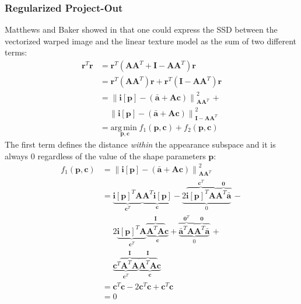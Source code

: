 \subsubsection{Regularized Project-Out}
\label{sec:rpo}

Matthews and Baker showed in \cite{Matthews2004} that one could express the SSD between the vectorized warped image and the linear texture model as the sum of two different terms:
\begin{equation}
    \begin{aligned}
        \mathbf{r}^T \mathbf{r} & = \mathbf{r}^T (\mathbf{A}\mathbf{A}^T + \mathbf{I} - \mathbf{A}\mathbf{A}^T) \mathbf{r}
        \\
        & = \mathbf{r}^T (\mathbf{A}\mathbf{A}^T) \mathbf{r} + \mathbf{r}^T (\mathbf{I} - \mathbf{A}\mathbf{A}^T) \mathbf{r}
        \\
        & = \left\| \mathbf{i}[\mathbf{p}] - \left( \bar{\mathbf{a}} + \mathbf{A} \mathbf{c} \right) \right\|_{\mathbf{A}\mathbf{A}^T}^2 \, + 
        \\
        & \quad \, \left\| \mathbf{i}[\mathbf{p}] - \left( \bar{\mathbf{a}} + \mathbf{A} \mathbf{c} \right) \right\|_{\mathbf{I} - \mathbf{A}\mathbf{A}^T}^2 
        \\
        & = \underset{\mathbf{p}, \mathbf{c}}{\mathrm{arg\,min\;}} f_1(\mathbf{p}, \mathbf{c}) + f_2(\mathbf{p}, \mathbf{c})
    \label{eq:ssd_terms}
    \end{aligned}
\end{equation}
The first term defines the distance \emph{within} the appearance subspace and it is always $0$ regardless of the value of the shape parameters $\mathbf{p}$:
\begin{equation}
    \begin{aligned}
        f_1(\mathbf{p}, \mathbf{c}) & = \left\| \mathbf{i}[\mathbf{p}] - \left( \bar{\mathbf{a}} + \mathbf{A} \mathbf{c} \right) \right\|_{\mathbf{A}\mathbf{A}^T}^2
        \\
        & = \underbrace{\mathbf{i}[\mathbf{p}]^T \mathbf{A}}_{\mathbf{c}^T} \underbrace{\mathbf{A}^T \mathbf{i}[\mathbf{p}]}_{\mathbf{c}} - \underbrace{2\overbrace{\mathbf{i}[\mathbf{p}]^T \mathbf{A}}^{\mathbf{c}^T} \overbrace{\mathbf{A}^T \bar{\mathbf{a}}}^{\mathbf{0}}}_{0} \, - 
        \\
        & \quad \,\, 2\underbrace{\mathbf{i}[\mathbf{p}]^T \mathbf{A}}_{\mathbf{c}^T} \underbrace{\overbrace{\mathbf{A}^T \mathbf{A}}^{\mathbf{I}} \mathbf{c}}_{\mathbf{c}} + \underbrace{\overbrace{\bar{\mathbf{a}}^T \mathbf{A}}^{\mathbf{0}^T} \overbrace{\mathbf{A}^T \bar{\mathbf{a}}}^{\mathbf{0}}}_{0} \, +
        \\
        & \quad \,\, \underbrace{\mathbf{c}^T \overbrace{\mathbf{A}^T \mathbf{A}}^{\mathbf{I}}}_{\mathbf{c}^T} \underbrace{\overbrace{\mathbf{A}^T \mathbf{A}}^{\mathbf{I}} \mathbf{c}}_{\mathbf{c}}
        \\
        & = \mathbf{c}^T\mathbf{c} - 2\mathbf{c}^T\mathbf{c} + \mathbf{c}^T\mathbf{c}
        \\
        & = 0
    \label{eq:ssd_term1}
    \end{aligned}
\end{equation}
